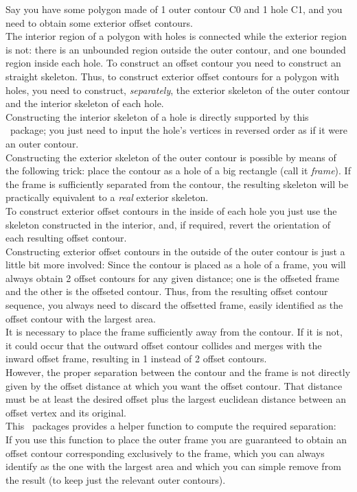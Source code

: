 Say you have some polygon made of 1 outer contour C0 and 1 hole C1, and you need to obtain some exterior offset contours.\\
The interior region of a polygon with holes is connected while the exterior region is not: there is an unbounded region outside the outer contour, and one bounded region inside each hole.
To construct an offset contour you need to construct an straight skeleton. Thus, to construct exterior offset contours for a polygon with holes, you need to construct, {\em separately}, the exterior skeleton of the outer contour and the interior skeleton of each hole.\\
Constructing the interior skeleton of a hole is directly supported by this \cgal\ package; you just need to input the hole's vertices in reversed order as if it were an outer contour.\\
Constructing the exterior skeleton of the outer contour is possible by means of the following trick: place the contour as a hole of a big rectangle (call it {\em frame}). If the frame is sufficiently separated from the contour, the resulting skeleton will be practically equivalent to a \textit{real} exterior skeleton.\\
To construct exterior offset contours in the inside of each hole you just use the skeleton constructed in the interior, and, if required, revert the orientation of each resulting offset contour.\\
Constructing exterior offset contours in the outside of the outer contour is just a little bit more involved: Since the contour is placed as a hole of a frame, you will always obtain 2 offset contours for any given distance; one is the offseted frame and the other is the offseted contour. Thus, from the resulting offset contour sequence, you always need to discard the offsetted frame, easily identified as the offset contour with the largest area.\\
It is necessary to place the frame sufficiently away from the contour. If it is not, it could occur that the outward offset contour collides and merges with the inward offset frame, resulting in 1 instead of 2 offset contours.\\
However, the proper separation between the contour and the frame is not directly given by the offset distance at which you want the offset contour. That distance must be at least the desired offset plus the largest euclidean distance between an offset vertex and its original.\\
This \cgal\ packages provides a helper function to compute the required separation:
\\
If you use this function to place the outer frame you are guaranteed to obtain an offset contour corresponding exclusively to the frame, which you can always identify as the one with the largest area and which you can simple remove from the result (to keep just the relevant outer contours).

